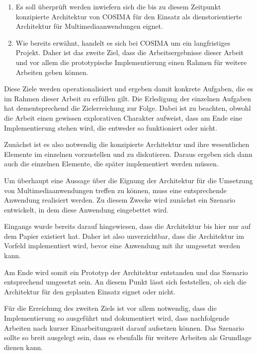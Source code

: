   \begin{enumerate}
    \item Es soll überprüft werden inwiefern sich die bis zu diesem Zeitpunkt konzipierte Architektur von COSIMA für den Einsatz als dienstorientierte Architektur für Multimediaanwendungen eignet. 
    \item Wie bereits erwähnt, handelt es sich bei COSIMA um ein langfristiges Projekt. Daher ist das zweite Ziel, dass die Arbeitsergebnisse dieser Arbeit und vor allem die prototypische Implementierung einen Rahmen für weitere Arbeiten geben können.
  \end{enumerate}
  
  Diese Ziele werden operationalisiert und ergeben damit konkrete Aufgaben, die es im Rahmen dieser Arbeit zu erfüllen gilt. Die Erledigung der einzelnen Aufgaben hat dementsprechend die Zielerreichung zur Folge. Dabei ist zu beachten, obwohl die Arbeit einen gewissen explorativen Charakter aufweist, dass am Ende eine Implementierung stehen wird, die entweder so funktioniert oder nicht.
  
  Zunächst ist es also notwendig die konzipierte Architektur und ihre wesentlichen Elemente im einzelnen vorzustellen und zu diskutieren. Daraus ergeben sich dann auch die einzelnen Elemente, die später implementiert werden müssen.
  
  Um überhaupt eine Aussage über die Eignung der Architektur für die Umsetzung von Multimediaanwendungen treffen zu können, muss eine entsprechende Anwendung realisiert werden. Zu diesem Zwecke wird zunächst ein Szenario entwickelt, in dem diese Anwendung eingebettet wird.
  
  Eingangs wurde bereits darauf hingewiesen, dass die Architektur bis hier nur auf dem Papier existiert hat. Daher ist also unverzichtbar, dass die Architektur im Vorfeld implementiert wird, bevor eine Anwendung mit ihr umgesetzt werden kann.
  
  Am Ende wird somit ein Prototyp der Architektur entstanden und das Szenario entsprechend umgesetzt sein. An diesem Punkt lässt sich feststellen, ob sich die Architektur für den geplanten Einsatz eignet oder nicht.
  
  Für die Erreichung des zweiten Ziels ist vor allem notwendig, dass die Implementierung so ausgeführt und dokumentiert wird, dass nachfolgende Arbeiten nach kurzer Einarbeitungszeit darauf aufsetzen können. Das Szenario sollte so breit ausgelegt sein, dass es ebenfalls für weitere Arbeiten als Grundlage dienen kann.
  
